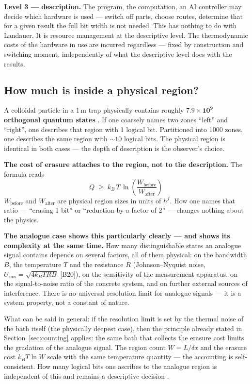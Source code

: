 \LB \textbf{Level 3 --- description.} The program, the computation, an AI
controller may decide which hardware is used --- switch off parts, choose routes,
determine that for a given result the full bit width is not needed. This has
nothing to do with Landauer. It is resource management at the descriptive level.
The thermodynamic costs of the hardware in use are incurred regardless --- fixed
by construction and switching moment, independently of what the descriptive level
does with the results.

\subsection{How much is inside a physical region?}

\LK A colloidal particle in a 1\,\textmu m trap physically contains roughly
$\mathbf{7.9\times10^{9}}$ \textbf{orthogonal quantum states}
. If one coarsely names two zones “left” and “right”, one describes
that region with 1 logical bit. Partitioned into 1000 zones, one describes the
same region with ${\sim}10$ logical bits. The physical region is identical in both
cases --- the depth of description is the observer's choice.

\LB \textbf{The cost of erasure attaches to the region, not to the description.}
The formula reads
\[
  \boxed{\;Q \;\ge\; k_B\,T\,\ln\!\left(\frac{W_{\text{before}}}{W_{\text{after}}}\right)\;}
\]
$W_{\text{before}}$ and $W_{\text{after}}$ are physical region sizes in units of
$h^f$. How one names that ratio --- “erasing 1 bit” or “reduction by a factor of
2” --- changes nothing about the physics.

\LK \textbf{The analogue case shows this particularly clearly --- and shows its
complexity at the same time.} How many distinguishable states an analogue signal
contains depends on several factors, all of them physical: on the bandwidth $B$,
the temperature $T$ and the resistance $R$ (Johnson--Nyquist noise,
$U_{\text{rms}} = \sqrt{4 k_B T R B}$ [B20]), on the sensitivity of the
measurement apparatus, on the signal-to-noise ratio of the concrete system, and on
further external sources of interference. There is no universal resolution limit
for analogue signals --- it is a system property, not a constant of nature.

What can be said in general: if the resolution limit is set by the thermal noise
of the bath itself (the physically deepest case), then the principle already
stated in Section~\ref{sec:counting} applies: the same bath that collects the
erasure cost limits the gradation of the analogue signal. The region count
$W = L/\delta x$ and the erasure cost $k_B T \ln W$ scale with the same
temperature quantity --- the accounting is self-consistent. How many logical bits
one ascribes to the analogue region is independent of this and remains a
descriptive decision .

